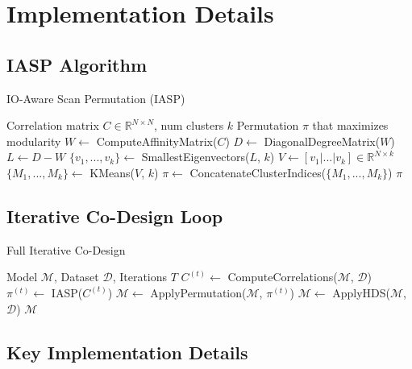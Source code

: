 \documentclass{article}
\begin{document}
\section{Implementation Details}
\label{sec:implementation}

\subsection{IASP Algorithm}

\begin{algorithm}[h]
\caption{IO-Aware Scan Permutation (IASP)}
\label{alg:iasp}
\begin{algorithmic}[1]
\Require Correlation matrix $C \in \mathbb{R}^{N \times N}$, num clusters $k$
\Ensure Permutation $\pi$ that maximizes modularity
\State $W \leftarrow$ ComputeAffinityMatrix($C$) 
\State $D \leftarrow$ DiagonalDegreeMatrix($W$)
\State $L \leftarrow D - W$ 
\State $\{v_1, ..., v_k\} \leftarrow$ SmallestEigenvectors($L$, $k$)
\State $V \leftarrow [v_1 | ... | v_k] \in \mathbb{R}^{N \times k}$
\State $\{M_1, ..., M_k\} \leftarrow$ KMeans($V$, $k$) 
\State $\pi \leftarrow$ ConcatenateClusterIndices($\{M_1, ..., M_k\}$)
\State \Return $\pi$
\end{algorithmic}
\end{algorithm}

\subsection{Iterative Co-Design Loop}

\begin{algorithm}[h]
\caption{Full Iterative Co-Design}
\label{alg:codesign}
\begin{algorithmic}[1]
\Require Model $\mathcal{M}$, Dataset $\mathcal{D}$, Iterations $T$
    \State $C^{(t)} \leftarrow$ ComputeCorrelations($\mathcal{M}$, $\mathcal{D}$)
    \State $\pi^{(t)} \leftarrow$ IASP($C^{(t)}$)
    \State $\mathcal{M} \leftarrow$ ApplyPermutation($\mathcal{M}$, $\pi^{(t)}$)
    \State $\mathcal{M} \leftarrow$ ApplyHDS($\mathcal{M}$, $\mathcal{D}$) 
\EndFor
\State \Return $\mathcal{M}$
\end{algorithmic}
\end{algorithm}

\subsection{Key Implementation Details}
\end{document}
